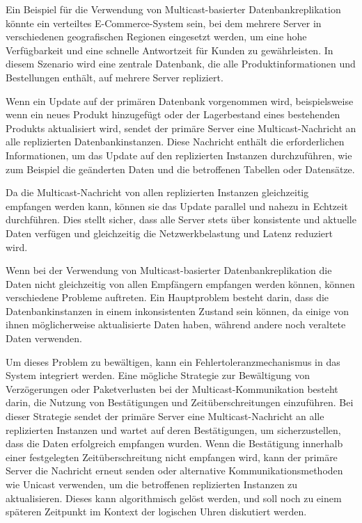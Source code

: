 \documentclass[../vs-script-first-v01.tex]{subfiles}
\begin{document}
Ein Beispiel für die Verwendung von Multicast-basierter Datenbankreplikation könnte ein verteiltes E-Commerce-System sein, bei dem mehrere Server in verschiedenen geografischen Regionen eingesetzt werden, um eine hohe Verfügbarkeit und eine schnelle Antwortzeit für Kunden zu gewährleisten. In diesem Szenario wird eine zentrale Datenbank, die alle Produktinformationen und Bestellungen enthält, auf mehrere Server repliziert.

Wenn ein Update auf der primären Datenbank vorgenommen wird, beispielsweise wenn ein neues Produkt hinzugefügt oder der Lagerbestand eines bestehenden Produkts aktualisiert wird, sendet der primäre Server eine Multicast-Nachricht an alle replizierten Datenbankinstanzen. Diese Nachricht enthält die erforderlichen Informationen, um das Update auf den replizierten Instanzen durchzuführen, wie zum Beispiel die geänderten Daten und die betroffenen Tabellen oder Datensätze.

Da die Multicast-Nachricht von allen replizierten Instanzen gleichzeitig empfangen werden kann, können sie das Update parallel und nahezu in Echtzeit durchführen. Dies stellt sicher, dass alle Server stets über konsistente und aktuelle Daten verfügen und gleichzeitig die Netzwerkbelastung und Latenz reduziert wird.

Wenn bei der Verwendung von Multicast-basierter Datenbankreplikation die Daten nicht gleichzeitig von allen Empfängern empfangen werden können, können verschiedene Probleme auftreten. Ein Hauptproblem besteht darin, dass die Datenbankinstanzen in einem inkonsistenten Zustand sein können, da einige von ihnen möglicherweise aktualisierte Daten haben, während andere noch veraltete Daten verwenden.

Um dieses Problem zu bewältigen, kann ein Fehlertoleranzmechanismus in das System integriert werden. Eine mögliche Strategie zur Bewältigung von Verzögerungen oder Paketverlusten bei der Multicast-Kommunikation besteht darin, die Nutzung von Bestätigungen und Zeitüberschreitungen einzuführen. Bei dieser Strategie sendet der primäre Server eine Multicast-Nachricht an alle replizierten Instanzen und wartet auf deren Bestätigungen, um sicherzustellen, dass die Daten erfolgreich empfangen wurden. Wenn die Bestätigung innerhalb einer festgelegten Zeitüberschreitung nicht empfangen wird, kann der primäre Server die Nachricht erneut senden oder alternative Kommunikationsmethoden wie Unicast verwenden, um die betroffenen replizierten Instanzen zu aktualisieren. Dieses kann algorithmisch gelöst werden, und soll noch zu einem späteren Zeitpunkt im Kontext der logischen Uhren diskutiert werden. 
\end{document}
